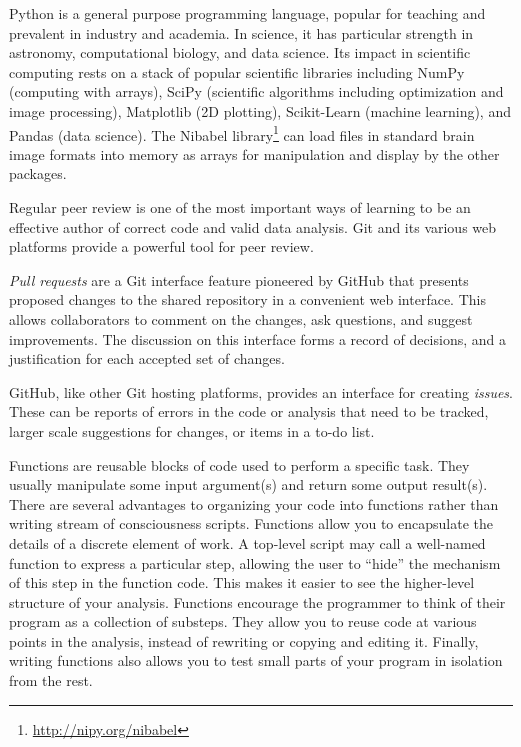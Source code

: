 Python is a general purpose programming language,
popular for teaching and prevalent in industry and academia.
In science, it has particular strength in
astronomy, computational biology, and data science.
Its impact in scientific computing rests on a stack of popular scientific
libraries including NumPy (computing with arrays), SciPy (scientific
algorithms including optimization and image processing), Matplotlib (2D
plotting), Scikit-Learn (machine learning), and Pandas (data science).  The
Nibabel library\footnote{\url{http://nipy.org/nibabel}\label{nibabel}} can load
files in standard brain image formats into memory as arrays for manipulation
and display by the other packages.

Regular peer review is one of the most important ways of learning
to be an effective author of correct code and valid data analysis.  Git and its
various web platforms provide a powerful tool for peer review.

\emph{Pull requests} are a Git interface feature pioneered by GitHub that
presents proposed changes to the shared repository in a convenient web
interface. This allows collaborators to comment on the changes, ask questions,
and suggest improvements.  The discussion on this interface forms a record of
decisions, and a justification for each accepted set of changes.

GitHub, like other Git hosting platforms, provides an interface for creating
\emph{issues}.  These can be reports of errors in the code or analysis that need
to be tracked, larger scale suggestions for changes, or items in a to-do list.

Functions are reusable blocks of code used to perform a specific task.
They usually manipulate some input argument(s) and return some output
result(s).
There are several advantages to organizing your code into functions rather
than writing stream of consciousness scripts.
Functions allow you to encapsulate the details of a discrete element of
work.  A top-level script may call a well-named function to express a
particular step, allowing the user to ``hide'' the mechanism of this step in
the function code.  This makes it easier to see the higher-level structure of
your analysis.
Functions encourage the programmer to think of their program as a collection
of substeps.
They allow you to reuse code at various points in the analysis, instead of
rewriting or copying and editing it.
Finally, writing functions also allows you to test small parts of your program
in isolation from the rest.

